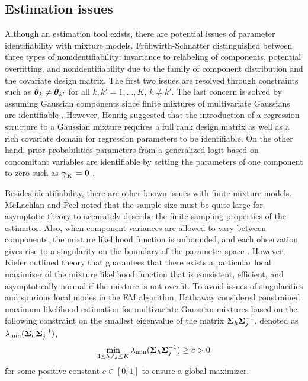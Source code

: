 \subsection{Estimation issues}
Although an estimation tool exists, there are potential issues of parameter identifiability with mixture models. Fr{\"u}hwirth-Schnatter \cite{fruhwirth2006} distinguished between three types of nonidentifiability: invariance to  relabeling of components, potential overfitting, and nonidentifiability due to the family of component distribution and the covariate design matrix. The first two issues are resolved through constraints such as $\boldsymbol\theta_{k}\not=\boldsymbol\theta_{k'}$ for all $k,k'=1,...,K$, $k\not=k'$. The last concern is solved by assuming Gaussian components since finite mixtures of multivariate Gaussians are identifiable \cite{teicher1963,yakowitz1968}. However, Hennig \cite{hennig2000} suggested that the introduction of a regression structure to a Gaussian mixture requires a full rank design matrix as well as a rich covariate domain for regression parameters to be identifiable. On the other hand, prior probabilities parameters from a generalized logit based on concomitant variables are identifiable by setting the parameters of one component to zero such as $\boldsymbol\gamma_{K}=\boldsymbol0$ \cite{jiang1999}.

Besides identifiability, there are other known issues with finite mixture models. McLachlan and Peel \cite{mclachlan2000} noted that the sample size must be quite large for asymptotic theory to accurately describe the finite sampling properties of the estimator. Also, when component variances are allowed to vary between components, the mixture likelihood function is unbounded, and each observation gives rise to a singularity on the boundary of the parameter space \cite{day1969,kiefer1956}. However, Kiefer \cite{kiefer1978} outlined theory that guarantees that there exists a particular local maximizer of the mixture likelihood function that is consistent, efficient, and asymptotically normal if the mixture is not overfit. To avoid issues of singularities and spurious local modes in the EM algorithm, Hathaway \cite{hathaway1985} considered constrained maximum likelihood estimation for multivariate Gaussian mixtures based on the following constraint on the smallest eigenvalue of the matrix $\boldsymbol\Sigma_{h}\boldsymbol\Sigma_{j}^{-1}$, denoted as $\lambda_{\text{min}}(\boldsymbol\Sigma_{h}\boldsymbol\Sigma_{j}^{-1})$,
$$\min_{1\leq h\not=j\leq K}\lambda_{\text{min}}(\boldsymbol\Sigma_{h}\boldsymbol\Sigma_{j}^{-1})\geq c > 0$$ for some positive constant $c\in[0,1]$ to ensure a global maximizer. 


